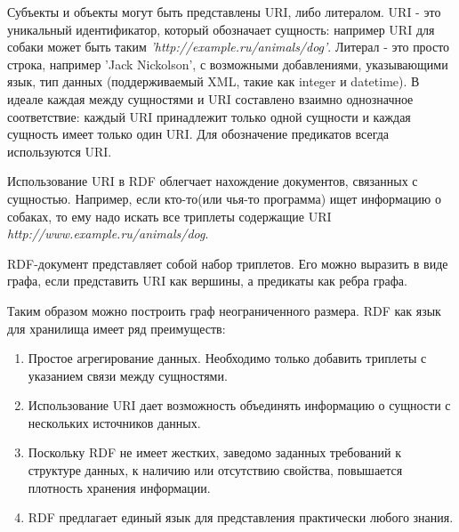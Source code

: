 \documentclass[specialist,subf,href,colorlinks=true
]{disser}
\begin{document}
Субъекты и объекты могут быть представлены URI, либо литералом. URI - это уникальный идентификатор, который обозначает сущность: например URI для собаки может быть таким \textit{'http://example.ru/animals/dog'}. Литерал - это просто строка, например 'Jack Nickolson', с возможными добавлениями, указывающими язык, тип данных (поддерживаемый XML, такие как integer и datetime). В идеале каждая между сущностями и URI составлено взаимно однозначное соответствие: каждый URI принадлежит только одной сущности и каждая сущность имеет только один URI.
Для обозначение предикатов всегда используются URI.

Использование URI в RDF облегчает нахождение документов, связанных с сущностью. Например, если кто-то(или чья-то программа) ищет информацию о собаках, то ему надо искать все триплеты содержащие URI \textit{http://www.example.ru/animals/dog}.

RDF-документ представляет собой набор триплетов. Его можно выразить в виде графа, если представить URI как вершины, а предикаты как ребра графа.

\par {}

Таким образом можно построить граф неограниченного размера.
RDF как язык для хранилища имеет ряд преимуществ:
\begin{enumerate}
\item Простое агрегирование данных. Необходимо только добавить триплеты с указанием связи между сущностями.
\item Использование URI дает возможность объединять информацию о сущности с нескольких источников данных.
\item Поскольку RDF не имеет жестких, заведомо заданных требований к структуре данных, к наличию или отсутствию свойства, повышается плотность хранения информации.
\item RDF предлагает единый язык для представления практически любого знания.
\end{enumerate}
\end{document}
